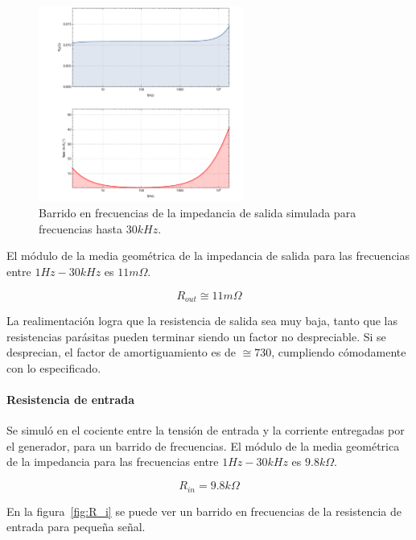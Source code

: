 \documentclass[a4paper,12pt,twoside]{article}
\begin{document}
\begin{figure}[H]
	\centering
	\includegraphics[width=0.6\textwidth]{img/sim/R_out-zoom}
	\caption{Barrido en frecuencias de la impedancia de salida simulada para frecuencias hasta $30kHz$.}
	\label{fig:R_out-zoom}
\end{figure}

El módulo de la media geométrica de la impedancia de salida para las frecuencias entre $1Hz-30kHz$ es $11m\Omega$.

\[R_{out}\cong 11m\Omega\]

La realimentación logra que la resistencia de salida sea muy baja, tanto que las resistencias parásitas pueden terminar siendo un factor no despreciable. Si se desprecian, el factor de amortiguamiento es de $\cong 730$, cumpliendo cómodamente con lo especificado.


\paragraph{Resistencia de entrada}

Se simuló en el cociente entre la tensión de entrada y la corriente entregadas por el generador, para un barrido de frecuencias. El módulo de la media geométrica de la impedancia para las frecuencias entre $1Hz-30kHz$ es $9.8k\Omega$.

\[R_{in}=9.8k\Omega\]

En la figura~\ref{fig:R_i} se puede ver un barrido en frecuencias de la resistencia de entrada para pequeña señal.
\end{document}
